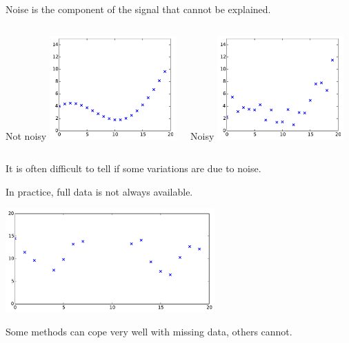 \documentclass{beamer}
\begin{document}
\begin{frame}{}
 Noise is the component of the signal that cannot be explained.\\
\vspace{5mm}
\begin{columns}[c]
\column{5cm}
\begin{center}
Not noisy
\includegraphics[height=4cm]{figures/2_noisyno}
\end{center}
\column{5cm}
\begin{center}
Noisy
\includegraphics[height=4cm]{figures/2_noisy}
\end{center}
\end{columns}
\vspace{5mm}
It is often difficult to tell if some variations are due to noise.
\end{frame}

\begin{frame}{}
 In practice, full data is not always available.\\
\vspace{5mm}
\begin{center}
\includegraphics[height=4cm]{figures/2_missing}
\end{center}
\vspace{5mm}
Some methods can cope very well with missing data, others cannot.
\end{frame}
\end{document}
